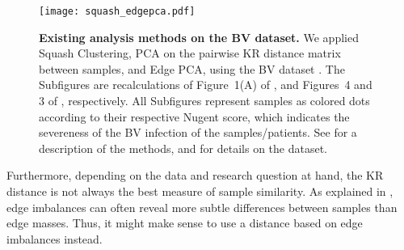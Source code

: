 \begin{figure}[!htb]
    \centering
    \texttt{[image: squash\_edgepca.pdf]}
    \begin{subfigure}{0pt}
        \label{fig:squash_edgepca:sub:squash}
    \end{subfigure}
    \begin{subfigure}{0pt}
        \label{fig:squash_edgepca:sub:pca}
    \end{subfigure}
    \begin{subfigure}{0pt}
        \label{fig:squash_edgepca:sub:epca}
    \end{subfigure}
    \caption[Existing analysis methods on the BV dataset]{
        \textbf{Existing analysis methods on the BV dataset.}
        We applied  Squash Clustering,
         PCA on the pairwise KR distance matrix between samples,
        and  Edge PCA,
        using the \acf{BV} dataset \cite{Srinivasan2012}.
        The Subfigures are recalculations of Figure~1(A) of \cite{Srinivasan2012},
        and Figures~4 and 3 of \cite{Matsen2011b}, respectively.
        All Subfigures represent samples as colored dots according to their respective Nugent score,
        which indicates the severeness of the \ac{BV} infection of the samples/patients.
        See  for a description of the methods,
        and  for details on the dataset.
    }
    \label{fig:squash_edgepca}
\end{figure}

Furthermore, depending on the data and research question at hand,
the KR distance is not always the best measure of sample similarity.
As explained in ,
edge imbalances can often reveal more subtle differences between samples than edge masses.
Thus, it might make sense to use a distance based on edge imbalances instead.

